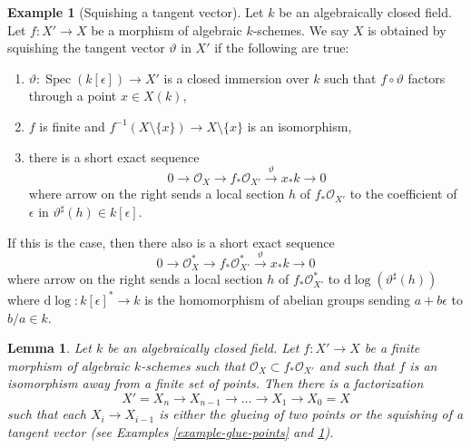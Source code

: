 \documentclass{amsart}
\theoremstyle{plain}
\newtheorem{lemma}[subsection]{Lemma}
\theoremstyle{definition}
\newtheorem{example}[subsection]{Example}
\theoremstyle{remark}
\numberwithin{equation}{subsection}
\def\Spec{\mathop{\mathrm{Spec}}}
\begin{document}
\begin{example}[Squishing a tangent vector]
\label{example-squish-tangent-vector}
Let $k$ be an algebraically closed field. Let $f : X' \to X$
be a morphism of algebraic $k$-schemes. We say $X$ is
obtained by squishing the tangent vector $\vartheta$ in $X'$
if the following are true:
\begin{enumerate}
\item $\vartheta : \Spec(k[\epsilon]) \to X'$ is a closed immersion
over $k$ such that $f \circ \vartheta$ factors through a point $x \in X(k)$,
\item $f$ is finite and
$f^{-1}(X \setminus \{x\}) \to X \setminus \{x\}$ is an isomorphism,
\item there is a short exact sequence
$$
0 \to \mathcal{O}_X \to f_*\mathcal{O}_{X'} \xrightarrow{\vartheta} x_*k \to 0
$$
where arrow on the right sends a local section $h$ of $f_*\mathcal{O}_{X'}$
to the coefficient of $\epsilon$ in $\vartheta^\sharp(h) \in k[\epsilon]$.
\end{enumerate}
If this is the case, then there also is a short exact sequence
$$
0 \to \mathcal{O}_X^* \to f_*\mathcal{O}_{X'}^*
\xrightarrow{\vartheta} x_*k \to 0
$$
where arrow on the right sends a local section $h$ of $f_*\mathcal{O}_{X'}^*$
to $\text{d}\log(\vartheta^\sharp(h))$ where
$\text{d}\log : k[\epsilon]^* \to k$
is the homomorphism of abelian groups sending $a + b\epsilon$ to $b/a \in k$.
\end{example}

\begin{lemma}
\label{lemma-factor-almost-isomorphism}
Let $k$ be an algebraically closed field. Let $f : X' \to X$ be a
finite morphism of algebraic $k$-schemes such that
$\mathcal{O}_X \subset f_*\mathcal{O}_{X'}$ and such that $f$ is an
isomorphism away from a finite set of points. Then there is a factorization
$$
X' = X_n \to X_{n - 1} \to \ldots \to X_1 \to X_0 = X
$$
such that each $X_i \to X_{i - 1}$ is either the glueing of
two points or the squishing of a tangent vector
(see Examples \ref{example-glue-points} and
\ref{example-squish-tangent-vector}).
\end{lemma}
\end{document}
